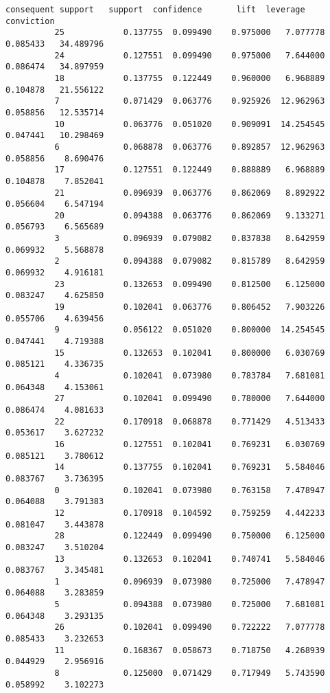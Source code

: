 \documentclass[11pt]{article}
\begin{document}
\begin{Verbatim}[commandchars=\\\{\}]
              consequent support   support  confidence       lift  leverage  conviction  
          25            0.137755  0.099490    0.975000   7.077778  0.085433   34.489796  
          24            0.127551  0.099490    0.975000   7.644000  0.086474   34.897959  
          18            0.137755  0.122449    0.960000   6.968889  0.104878   21.556122  
          7             0.071429  0.063776    0.925926  12.962963  0.058856   12.535714  
          10            0.063776  0.051020    0.909091  14.254545  0.047441   10.298469  
          6             0.068878  0.063776    0.892857  12.962963  0.058856    8.690476  
          17            0.127551  0.122449    0.888889   6.968889  0.104878    7.852041  
          21            0.096939  0.063776    0.862069   8.892922  0.056604    6.547194  
          20            0.094388  0.063776    0.862069   9.133271  0.056793    6.565689  
          3             0.096939  0.079082    0.837838   8.642959  0.069932    5.568878  
          2             0.094388  0.079082    0.815789   8.642959  0.069932    4.916181  
          23            0.132653  0.099490    0.812500   6.125000  0.083247    4.625850  
          19            0.102041  0.063776    0.806452   7.903226  0.055706    4.639456  
          9             0.056122  0.051020    0.800000  14.254545  0.047441    4.719388  
          15            0.132653  0.102041    0.800000   6.030769  0.085121    4.336735  
          4             0.102041  0.073980    0.783784   7.681081  0.064348    4.153061  
          27            0.102041  0.099490    0.780000   7.644000  0.086474    4.081633  
          22            0.170918  0.068878    0.771429   4.513433  0.053617    3.627232  
          16            0.127551  0.102041    0.769231   6.030769  0.085121    3.780612  
          14            0.137755  0.102041    0.769231   5.584046  0.083767    3.736395  
          0             0.102041  0.073980    0.763158   7.478947  0.064088    3.791383  
          12            0.170918  0.104592    0.759259   4.442233  0.081047    3.443878  
          28            0.122449  0.099490    0.750000   6.125000  0.083247    3.510204  
          13            0.132653  0.102041    0.740741   5.584046  0.083767    3.345481  
          1             0.096939  0.073980    0.725000   7.478947  0.064088    3.283859  
          5             0.094388  0.073980    0.725000   7.681081  0.064348    3.293135  
          26            0.102041  0.099490    0.722222   7.077778  0.085433    3.232653  
          11            0.168367  0.058673    0.718750   4.268939  0.044929    2.956916  
          8             0.125000  0.071429    0.717949   5.743590  0.058992    3.102273  
\end{Verbatim}
            
\end{document}
